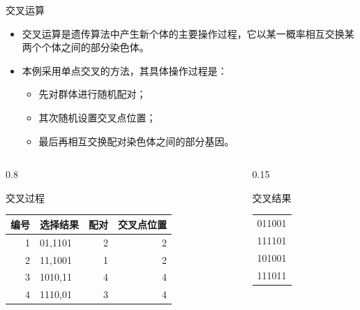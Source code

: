 \documentclass[presentation]{beamer}
\begin{document}
\begin{frame}[label={sec:orge526152}]{交叉运算}
\begin{itemize}
\item <2-> 交叉运算是遗传算法中产生新个体的主要操作过程，它以某一概率相互交换某两个个体之间的部分染色体。
\item <3-> 本例采用单点交叉的方法，其具体操作过程是：
\begin{itemize}
\item 先对群体进行随机配对；
\item 其次随机设置交叉点位置；
\item 最后再相互交换配对染色体之间的部分基因。
\end{itemize}
\end{itemize}
\begin{columns}
\begin{column}{0.8\columnwidth}
\begin{block}{交叉过程}
\begin{center}
\begin{tabular}{rlrr}
编号 & 选择结果 & 配对 & 交叉点位置\\
\hline
1 & 01,1101 & 2 & 2\\
2 & 11,1001 & 1 & 2\\
3 & 1010,11 & 4 & 4\\
4 & 1110,01 & 3 & 4\\
\end{tabular}
\end{center}
\end{block}
\end{column}
\begin{column}{0.15\columnwidth}
\begin{block}{交叉结果}
\begin{center}
\begin{tabular}{r}
011001\\
111101\\
101001\\
111011\\
\end{tabular}
\end{center}
\end{block}
\end{column}
\end{columns}
\end{frame}
\end{document}
